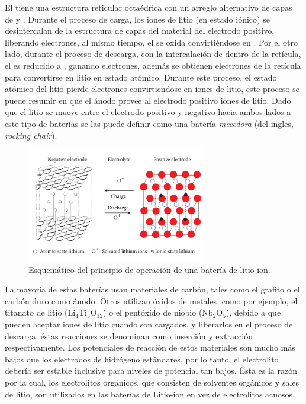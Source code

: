\documentclass[10pt,a4paper]{article}
\begin{document}
\noindent El  tiene una estructura reticular octa\'edrica con un
arreglo alternativo de capas de  y . Durante el proceso de
carga, los iones de litio (en estado iónico) se desintercalan de la estructura
de capas del material del electrodo positivo, liberando electrones, al mismo
tiempo, el  se oxida convirti\'endose en .  Por el otro
lado, durante el proceso de descarga, con la intercalación de  dentro de
la ret\'icula, el  es reducido a , ganando electrones,
adem\'as se obtienen electrones de la ret\'icula para convertirse en litio en 
estado atómico. Durante este proceso, el estado atómico del litio pierde 
electrones convirtiendose en iones de litio, este proceso se puede resumir en 
que el ánodo provee al electrodo positivo iones de litio. Dado que el litio se 
mueve entre el electrodo positivo y negativo hacia ambos lados a este tipo de 
baterías se las puede definir como una batería \emph{mecedora} (del ingles,
\emph{rocking chair}).

\begin{figure}[h!]
    \begin{center}
	\includegraphics[width=0.7\textwidth]{prin_litio}
	\caption{Esquem\'atico del principio de operaci\'on de una bater\'ia de
	litio-ion.}
	\label{op_lithium-ion}
    \end{center}
\end{figure}

\noindent La mayoría de estas baterías usan materiales de carbón, tales como el
grafito o el carbón duro como ánodo. Otros utilizan óxidos de metales, como por
ejemplo, el titanato de litio ($\mathrm{Li_4Ti_5O_{12}}$) o el pentóxido de
niobio ($\mathrm{Nb_2O_5}$), debido a que pueden aceptar iones de litio cuando
son cargados, y liberarlos en el proceso de descarga, \'estas reacciones se
denominan como inserción y extracción respectivamente. Los potenciales de
reacción de estos materiales son mucho más bajos que los electrodos de hidrógeno
estándares, por lo tanto, el electrolito debería ser estable inclusive para
niveles de potencial tan bajos. Ésta es la razón por la cual, los electrolitos
orgánicos, que consisten de solventes orgánicos y sales de litio, son utilizados
en las baterías de Litio-ion en vez de electrolitos acuosos.
\end{document}
